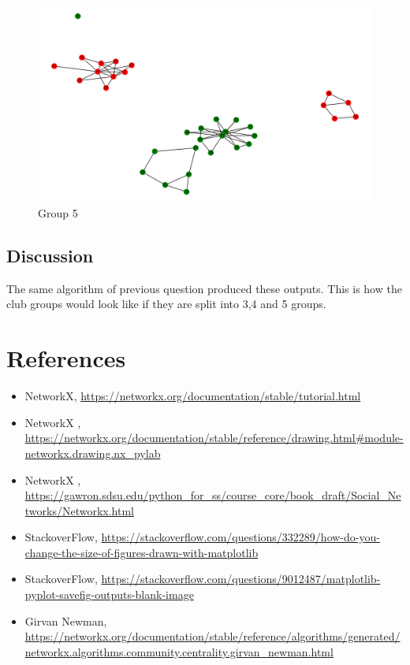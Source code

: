 \documentclass[12pt]{article}
\begin{document}
\begin{figure}[h]
    \centering
    \includegraphics[trim=8 0 8 8, clip, width=170mm] {24y.PNG}
    \caption{Group 5}
    \label{fig:web-growth}
\end{figure}
\subsection*{Discussion}
The same algorithm of previous question produced these outputs. This is how the club groups would look like if they are split into 3,4 and 5 groups.

\section*{References}

\begin{itemize}
    \item {NetworkX, \url{https://networkx.org/documentation/stable/tutorial.html}}
    \item {NetworkX , \url{https://networkx.org/documentation/stable/reference/drawing.html#module-networkx.drawing.nx_pylab}}
    \item {NetworkX , \url{https://gawron.sdsu.edu/python_for_ss/course_core/book_draft/Social_Networks/Networkx.html}}
    \item {StackoverFlow,
    \url{https://stackoverflow.com/questions/332289/how-do-you-change-the-size-of-figures-drawn-with-matplotlib}}
   \item {StackoverFlow,
    \url{https://stackoverflow.com/questions/9012487/matplotlib-pyplot-savefig-outputs-blank-image}}
    \item {Girvan Newman,
    \url{https://networkx.org/documentation/stable/reference/algorithms/generated/networkx.algorithms.community.centrality.girvan_newman.html}}
   
    
\end{itemize} 
\end{document}
